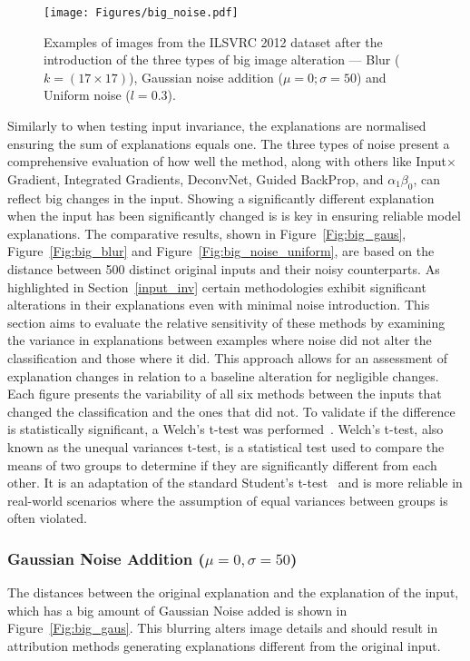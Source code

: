 \begin{figure}[ht!]
	\begin{center}
		\texttt{[image: Figures/big\_noise.pdf]}
	\end{center}
	\caption{Examples of images from the ILSVRC 2012 dataset after the introduction of the three types of big image alteration --- Blur ($k = (17 \times 17)$), Gaussian noise addition ($\mu= 0; \sigma=50$) and Uniform noise ($l = 0.3$).}
	\label{Fig:noisy_images_2}
\end{figure} 

Similarly to when testing input invariance, the explanations are normalised ensuring the sum of explanations equals one. The three types of noise present a comprehensive evaluation of how well the \CTC\/ method, along with others like Input$\times$Gradient, Integrated Gradients, DeconvNet, Guided BackProp, and \LRP\-$\alpha_1\beta_0$, can reflect big changes in the input. Showing a significantly different explanation when the input has been significantly changed is is key in ensuring reliable model explanations. The comparative results, shown in Figure~\ref{Fig:big_gaus}, Figure~\ref{Fig:big_blur} and Figure~\ref{Fig:big_noise_uniform}, are based on the distance between 500 distinct original inputs and their noisy counterparts. As highlighted in Section~\ref{input_inv} certain methodologies exhibit significant alterations in their explanations even with minimal noise introduction. This section aims to evaluate the relative sensitivity of these methods by examining the variance in explanations between examples where noise did not alter the classification and those where it did. This approach allows for an assessment of explanation changes in relation to a baseline alteration for negligible changes. Each figure presents the variability of all six methods between the inputs that changed the classification and the ones that did not. To validate if the difference is statistically significant, a Welch's t-test was performed~\cite{welch1947generalization}. Welch's t-test, also known as the unequal variances t-test, is a statistical test used to compare the means of two groups to determine if they are significantly different from each other. It is an adaptation of the standard Student's t-test~\cite{student1908probable} and is more reliable in real-world scenarios where the assumption of equal variances between groups is often violated.


\subsubsection{Gaussian Noise Addition ($\mu = 0, \sigma = 50$)}
The distances between the original explanation and the explanation of the input, which has a big amount of Gaussian Noise added is shown in Figure~\ref{Fig:big_gaus}. This blurring alters image details and should result in attribution methods generating explanations different from the original input.


